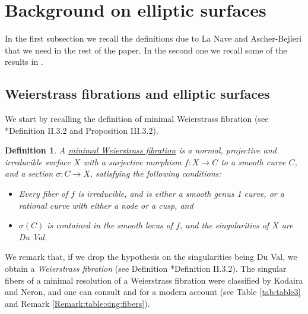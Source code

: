 \documentclass[11pt]{amsart}
\newtheorem{Def}[theorem]{Definition}
\theoremstyle{definition}
\begin{document}
\section{Background on elliptic surfaces}\label{Section:definitions:of:the:objects:we:parametrize}
In the first subsection we recall the definitions due to La Nave \cite{LaNave} and Ascher-Bejleri \cite{AB3} that we need in the rest
of the paper. In the second one we recall some of the results in \cite{LaNave}.
\subsection{Weierstrass fibrations and elliptic surfaces} 
We start by recalling the definition of minimal Weierstrass fibration (see \cite{Miranda}*{Definition II.3.2 and Proposition III.3.2}).
\begin{Def}\label{Def:minimal:W:fib}
 A \underline{minimal Weierstrass fibration} is a normal, projective and irreducible surface $X$ with a surjective morphism $f:X \to C$ to a smooth curve $C$, and a section $\sigma:C \to X$,
 satisfying the following conditions:
 \begin{itemize} 
\item Every fiber of $f$ is irreducible, and is either a smooth genus 1 curve, or a rational curve with either a node or a cusp, and
  \item $\sigma(C)$ is contained in the smooth locus of $f$, and the singularities of $X$ are Du Val.
 \end{itemize}
\end{Def}
We remark that, if we drop the hypothesis on the singularities being Du Val, we obtain a \emph{Weierstrass fibration} (see Definition \cite{Miranda}*{Definition II.3.2}).
The singular fibers of a minimal resolution of a Weierstrass fibration were classified by Kodaira and Neron, and one can consult \cite{Miranda} and \cite{Schutt:Shioda} for a modern account (see Table \ref{tab:table3} and Remark \ref{Remark:table:sing:fibers}). 
\end{document}
